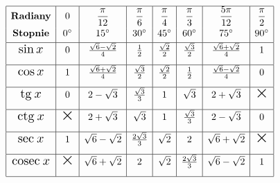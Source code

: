 \documentclass[14pt,a4paper]{extarticle}
\newcommand{\scalemath}[2][4]{\scalebox{#1}{\ensuremath{#2}}}
\begin{document}
\begin{center}
{%
\setlength\extrarowheight{10pt}

\(
\begin{array}{|c|c|c|c|c|c|c|c|}
   \hline
   \textbf{Radiany} & 0 & \dfrac{\pi}{12} & \dfrac{\pi}{6} & \dfrac{\pi}{4} & \dfrac{\pi}{3} & \dfrac{5\pi}{12} & \dfrac{\pi}{2}\\[0.2cm]
   \textbf{Stopnie} & 0^{\circ} & 15^{\circ} & 30^{\circ} & 45^{\circ} & 60^{\circ} & 75^{\circ} & 90^{\circ}\\[0.1cm]\hline
   \scalemath[1.3]{\sin x} & 0 & \frac{\sqrt{6}-\sqrt{2}}{4} & \frac{1}{2} & \frac{\sqrt{2}}{2} & \frac{\sqrt{3}}{2} & \frac{\sqrt{6}+\sqrt{2}}{4} & 1 \\[0.3cm]\hline
   \scalemath[1.3]{\cos x} & 1 & \frac{\sqrt{6}+\sqrt{2}}{4} & \frac{\sqrt{3}}{2} & \frac{\sqrt{2}}{2} & \frac{1}{2} & \frac{\sqrt{6}-\sqrt{2}}{4} & 0 \\[0.3cm]\hline
   \scalemath[1.3]{\text{tg}\: x} & 0 & 2 - \sqrt{3} & \frac{\sqrt{3}}{3} & 1 & \sqrt{3} & 2 + \sqrt{3} & \scalemath[1.8]{\times} \\[0.3cm]\hline
   \scalemath[1.3]{\text{ctg}\: x} & \scalemath[1.8]{\times} & 2 + \sqrt{3} & \sqrt{3} & 1 & \frac{\sqrt{3}}{3} & 2 - \sqrt{3} & 0 \\[0.3cm]\hline
   \scalemath[1.3]{\text{sec}\: x} & 1 & \sqrt{6} - \sqrt{2} & \frac{2\sqrt{3}}{3} & \sqrt{2} & 2 & \sqrt{6} + \sqrt{2} & \scalemath[1.8]{\times} \\[0.3cm]\hline
   \scalemath[1.3]{\text{cosec}\: x} & \scalemath[1.8]{\times} & \sqrt{6} + \sqrt{2} & 2 & \sqrt{2} & \frac{2\sqrt{3}}{3} &  \sqrt{6} - \sqrt{2} & 1 \\[0.3cm]\hline
\end{array}
\)

}%
\end{center}




























\end{document}
